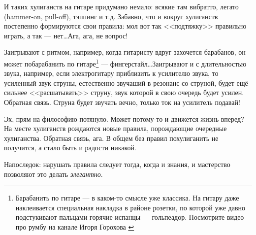 И таких хулиганств на гитаре придумано немало: всякие там вибратто, легато (hammer-on, pull-off), тэппинг и т.д. Забавно, что и вокруг хулиганств постепенно формируются свои правила: мол вот так <<подтяжку>> правильно играть, а так --- нет\ldots Ага, ага, не вопрос!

Заигрывают с ритмом, например, когда гитаристу вдруг захочется барабанов, он может побарабанить по гитаре\footnote{Барабанить по гитаре --- в каком-то смысле уже классика. На гитару даже наклеивается специальная накладка в районе розетки, по которой уже давно подстукивают пальцами горячие испанцы --- гольпеадор. Посмотрите видео про румбу на канале Игоря Горохова \cite{url:gorohovIgor}} --- фингерстайл\ldots Заигрывают и с длительностью звука, например, если электрогитару приблизить к усилителю звука, то усиленный звук струны, естественно звучаший в резонанс со струной, будет ещё сильнее <<расшатывать>> струну, звук которой в свою очередь будет усилен. Обратная связь. Струна будет звучать вечно, только ток на усилитель подавай!

Эх, прям на философию потянуло. Может потому-то и движется жизнь вперед? На месте хулиганств рождаются новые правила, порождающие очередные хулиганства. Обратная связь, ага. В общем без правил похулиганить не получится, а стало быть и радости никакой.

Напоследок: нарушать правила следует тогда, когда и знания, и мастерство позволяют это делать \emph{элегантно}.